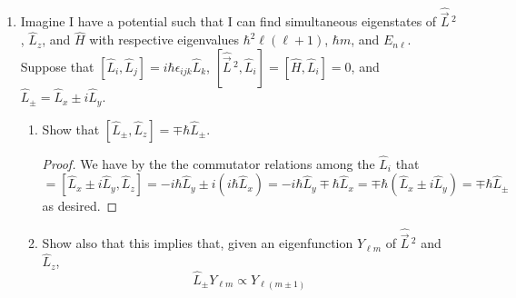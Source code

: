 \documentclass[../psets.tex]{subfiles}
\begin{document}
\begin{enumerate}
\begin{enumerate}
\begin{proof}
        \end{proof}
        \item For part (b), what would be the mean value $\Exp{\hat{z}}(t)$ of the $z$-coordinate if the mean value $\Exp{\hat{p}_z}$ of the momentum in the $z$-direction is constant at $p_0$ while $\Exp{\hat{z}}=0$ at time $t=0$?
        \begin{proof}
            Since momentum is conserved in the $z$-direction under this paradigm by part (b), we have that
            \begin{equation*}
                p_0 = \Exp{\hat{p}_z}
                = m\dv{t}[\Exp{\hat{z}}(t)]
            \end{equation*}
            It follows by integrating both sides and algebraically rearranging that
            \begin{equation*}
                \boxed{\Exp{\hat{z}}(t) = \frac{p_0t}{m}}
            \end{equation*}
        \end{proof}
    \end{enumerate}
    \item Imagine I have a potential such that I can find simultaneous eigenstates of $\hat{\vec{L}}{\,}^2$, $\hat{L}_z$, and $\hat{H}$ with respective eigenvalues $\hbar^2\ell(\ell+1)$, $\hbar m$, and $E_{n\ell}$. Suppose that $[\hat{L}_i,\hat{L}_j]=i\hbar\epsilon_{ijk}\hat{L}_k$, $[\hat{\vec{L}}{\,}^2,\hat{L}_i]=[\hat{H},\hat{L}_i]=0$, and $\hat{L}_\pm=\hat{L}_x\pm i\hat{L}_y$.
    \begin{enumerate}
        \item Show that $[\hat{L}_\pm,\hat{L}_z]=\mp\hbar\hat{L}_\pm$.
        \begin{proof}
            We have by the the commutator relations among the $\hat{L}_i$ that
            \begin{equation*}
                [\hat{L}_\pm,\hat{L}_z] = [\hat{L}_x\pm i\hat{L}_y,\hat{L}_z]
                = -i\hbar\hat{L}_y\pm i(i\hbar\hat{L}_x)
                = -i\hbar\hat{L}_y\mp\hbar\hat{L}_x
                = \mp\hbar(\hat{L}_x\pm i\hat{L}_y)
                = \mp\hbar\hat{L}_\pm
            \end{equation*}
            as desired.
        \end{proof}
        \item Show also that this implies that, given an eigenfunction $Y_{\ell m}$ of $\hat{\vec{L}}{\,}^2$ and $\hat{L}_z$,
        \begin{equation}
            \hat{L}_\pm Y_{\ell m} \propto Y_{\ell(m\pm 1)}

\end{equation}
\end{enumerate}
\end{enumerate}
\end{document}
